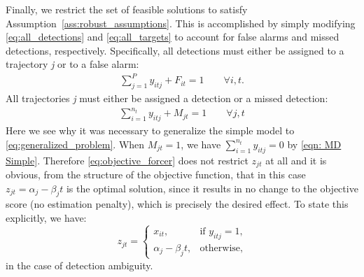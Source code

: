 Finally, we restrict the set of feasible solutions to satisfy Assumption~\ref{ass:robust_assumptions}. This is accomplished by simply modifying \eqref{eq:all_detections} and \eqref{eq:all_targets} to account for false alarms and missed detections, respectively. Specifically, all detections must either be assigned to a trajectory \textit{j} or to a false alarm:
\begin{align}\label{eqn: FA Simple}
\sum_{j=1}^{P} y_{itj} + F_{it} = 1 \qquad \forall i,t.
\end{align}
All trajectories \textit{j} must either be assigned a detection or a missed detection:
\begin{align}\label{eqn: MD Simple}
\sum_{i=1}^{n_{t}} y_{itj} + M_{jt} = 1 \qquad \forall j,t
\end{align}
Here we see why it was necessary to generalize the simple model to \eqref{eq:generalized_problem}. When $M_{jt} = 1$, we have $\sum_{i=1}^{n_t} y_{itj} = 0$ by \eqref{eqn: MD Simple}. Therefore \eqref{eq:objective_forcer} does not restrict $z_{jt}$ at all and it is obvious, from the structure of the objective function, that in this case $z_{jt}=\alpha_{j} - \beta_{j}t$ is the optimal solution, since it results in no change to the objective score (no estimation penalty), which is precisely the desired effect. To state this explicitly, we have: 
\[z_{jt} =
\begin{cases}
x_{it}, & \text{if $y_{itj} = 1$,} \\
\alpha_{j} - \beta_{j}t, & \text{otherwise,}
\end{cases}\]
in the case of detection ambiguity. 

